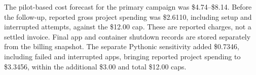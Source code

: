 The pilot-based cost forecast for the primary campaign was \$4.74--\$8.14. Before the follow-up, reported gross project spending was \$2.6110, including setup and interrupted attempts, against the \$12.00 cap. These are reported charges, not a settled invoice. Final app and container shutdown records are stored separately from the billing snapshot.
The separate Pythonic sensitivity added \$0.7346, including failed and interrupted apps, bringing reported project spending to \$3.3456, within the additional \$3.00 and total \$12.00 caps.
